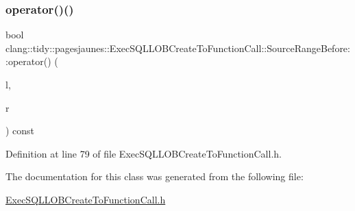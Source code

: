 \subsubsection{\texorpdfstring{operator()()}{operator()()}}
{\footnotesize\ttfamily bool clang\+::tidy\+::pagesjaunes\+::\+Exec\+S\+Q\+L\+L\+O\+B\+Create\+To\+Function\+Call\+::\+Source\+Range\+Before\+::operator() (\begin{DoxyParamCaption}\item[{const \hyperlink{classclang_1_1tidy_1_1pagesjaunes_1_1_exec_s_q_l_l_o_b_create_to_function_call_1_1_source_range_for_string_literals}{Source\+Range\+For\+String\+Literals} \&}]{l,  }\item[{const \hyperlink{classclang_1_1tidy_1_1pagesjaunes_1_1_exec_s_q_l_l_o_b_create_to_function_call_1_1_source_range_for_string_literals}{Source\+Range\+For\+String\+Literals} \&}]{r }\end{DoxyParamCaption}) const\hspace{0.3cm}{\ttfamily [inline]}}



Definition at line 79 of file Exec\+S\+Q\+L\+L\+O\+B\+Create\+To\+Function\+Call.\+h.



The documentation for this class was generated from the following file\+:\begin{DoxyCompactItemize}
\item 
\hyperlink{_exec_s_q_l_l_o_b_create_to_function_call_8h}{Exec\+S\+Q\+L\+L\+O\+B\+Create\+To\+Function\+Call.\+h}\end{DoxyCompactItemize}
